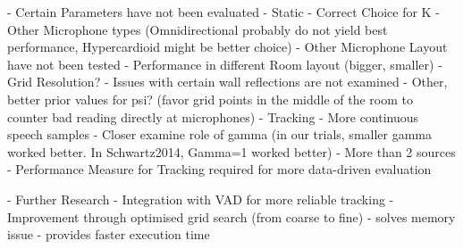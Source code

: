 - Certain Parameters have not been evaluated
    - Static
        - Correct Choice for K
        - Other Microphone types (Omnidirectional probably do not yield best performance, Hypercardioid might be better choice)
        - Other Microphone Layout have not been tested
        - Performance in different Room layout (bigger, smaller)
        - Grid Resolution?
        - Issues with certain wall reflections are not examined
        - Other, better prior values for psi? (favor grid points in the middle of the room to counter bad reading directly at microphones)
    - Tracking
        - More continuous speech samples
        - Closer examine role of gamma (in our trials, smaller gamma worked better. In Schwartz2014, Gamma=1 worked better)
        - More than 2 sources
        - Performance Measure for Tracking required for more data-driven evaluation

- Further Research
    - Integration with VAD for more reliable tracking
    - Improvement through optimised grid search (from coarse to fine)
        - solves memory issue
        - provides faster execution time
